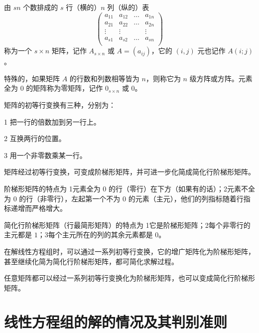 \begin{definition}
	由 $sn$ 个数排成的 $s$ 行（横的）$n$ 列（纵的）表
	\begin{equation*}
		\left(
			\begin{matrix}
				a_{11}&a_{12}&\ldots&a_{1n}\\
				a_{21}&a_{22}&\ldots&a_{2n}\\
				\vdots&\vdots&&\vdots\\a_{s1}&a_{s2}&\ldots&a_{sn}\\
			\end{matrix}
		\right)
	\end{equation*}
	称为一个 $s\times n$ 矩阵，记作 $A_{s\times n}$ 或 $A=(a_{ij})$，它的 $(i,j)$ 元也记作 $A(i;j)$。
\end{definition}

特殊的，如果矩阵 $A$ 的行数和列数相等皆为 $n$，则称它为 $n$ 级方阵或方阵。元素全为 $0$ 的矩阵称为零矩阵，记作 $0_{s\times n}$ 或 $0$。

\begin{definition}[初等行变换]
	矩阵的初等行变换有三种，分别为：
	
	\num{1} 把一行的倍数加到另一行上。

	\num{2} 互换两行的位置。

	\num{3} 用一个非零数乘某一行。
\end{definition}

矩阵经过初等行变换，可变成阶梯形矩阵，并可进一步化简成简化行阶梯形矩阵。

阶梯形矩阵的特点为 \num{1}元素全为 $0$ 的行（零行）在下方（如果有的话）；\num{2}元素不全为 $0$ 的行（非零行），左起第一个不为 $0$ 的元素（主元），他们的列指标随着行指标递增而严格增大。

简化行阶梯形矩阵（行最简形矩阵）的特点为 \num{1}它是阶梯形矩阵；\num{2}每个非零行的主元都是 $1$；\num{3}每个主元所在的列的其余元素都是 $0$。

在解线性方程组时，可以通过一系列初等行变换，它的增广矩阵化为阶梯形矩阵，甚至继续化简为简化行阶梯形矩阵，都可简化求解过程。

\begin{theorem}
	任意矩阵都可以经过一系列初等行变换化为阶梯形矩阵，也可以变成简化行阶梯形矩阵。
\end{theorem}

\section{线性方程组的解的情况及其判别准则}


